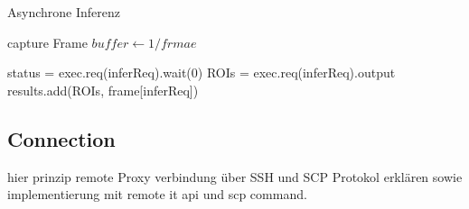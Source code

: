 \begin{algorithm}[H]
    \caption{Asynchrone Inferenz}
    \begin{algorithmic}
        \WHILE{\TRUE}

        \STATE capture Frame
            \STATE $buffer \leftarrow 1 / frmae$
        \ENDIF

        \STATE status = exec.req(inferReq).wait(0)
            \STATE ROIs = exec.req(inferReq).output
            \STATE results.add(ROIs, frame[inferReq])
        \ENDIF

        \ENDFOR

        \ENDWHILE

    \end{algorithmic}
\end{algorithm}



\subsection*{Connection}

hier prinzip remote Proxy verbindung über SSH und SCP Protokol erklären
sowie implementierung mit remote it api und scp command.





